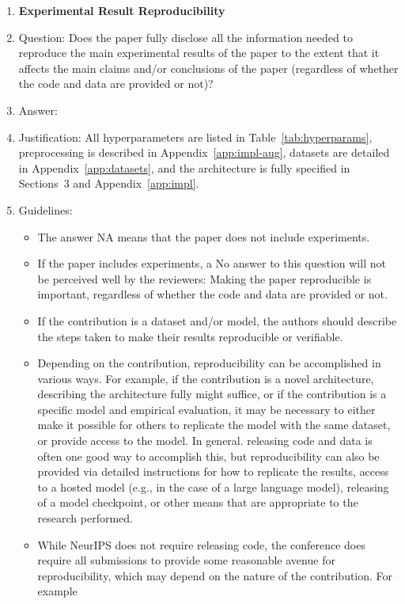 \documentclass{article}
\theoremstyle{plain}
\theoremstyle{definition}
\begin{document}
\begin{enumerate}
  \item {\bf Experimental Result Reproducibility}
  \item[] Question: Does the paper fully disclose all the information needed to reproduce the main experimental results of the paper to the extent that it affects the main claims and/or conclusions of the paper (regardless of whether the code and data are provided or not)?
  \item[] Answer: \answerYes{}
  \item[] Justification: All hyperparameters are listed in Table~\ref{tab:hyperparams}, preprocessing is described in Appendix~\ref{app:impl-aug}, datasets are detailed in Appendix~\ref{app:datasets}, and the architecture is fully specified in Sections~3 and Appendix~\ref{app:impl}.
  \item[] Guidelines:
    \begin{itemize}
      \item The answer NA means that the paper does not include experiments.
      \item If the paper includes experiments, a No answer to this question will not be perceived well by the reviewers: Making the paper reproducible is important, regardless of whether the code and data are provided or not.
      \item If the contribution is a dataset and/or model, the authors should describe the steps taken to make their results reproducible or verifiable.
      \item Depending on the contribution, reproducibility can be accomplished in various ways. For example, if the contribution is a novel architecture, describing the architecture fully might suffice, or if the contribution is a specific model and empirical evaluation, it may be necessary to either make it possible for others to replicate the model with the same dataset, or provide access to the model. In general. releasing code and data is often one good way to accomplish this, but reproducibility can also be provided via detailed instructions for how to replicate the results, access to a hosted model (e.g., in the case of a large language model), releasing of a model checkpoint, or other means that are appropriate to the research performed.
      \item While NeurIPS does not require releasing code, the conference does require all submissions to provide some reasonable avenue for reproducibility, which may depend on the nature of the contribution. For example
        \begin{enumerate}

\end{enumerate}
\end{itemize}
\end{enumerate}
\end{document}
